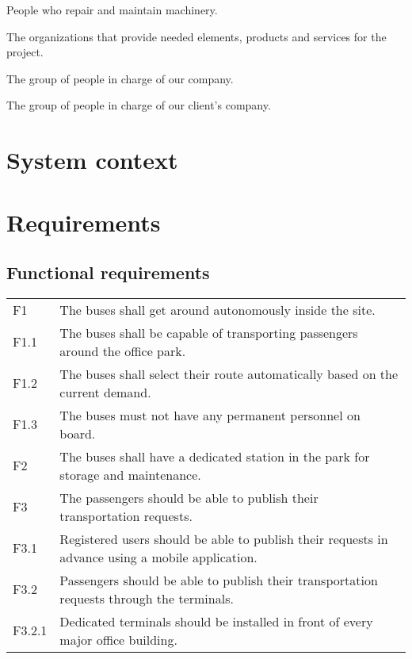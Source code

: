 \documentclass[a4paper]{article}
\begin{document}
\begin{description}[align=right,leftmargin=6cm,style=multiline]
	\item[mechanics]
		People who repair and maintain machinery.

	\item[suppliers]
		The organizations that provide needed elements, products and
		services for the project.

	\item[our company’s management]
		The group of people in charge of our company.

	\item[client's management]
		The group of people in charge of our client's company.
\end{description}



\section{System context}



\section{Requirements}

\subsection{Functional requirements}
\begin{tabularx}{\textwidth}{p{.75cm} X}
	F1     & The buses shall get around autonomously inside the site. \\
	F1.1   & The buses shall be capable of transporting passengers around
	         the office park. \\
	F1.2   & The buses shall select their route automatically based on the
	         current demand. \\
        F1.3   & The buses must not have any permanent personnel on board. \\
	F2     & The buses shall have a dedicated station in the park for
	         storage and maintenance. \\
	F3     & The passengers should be able to publish their transportation
	         requests. \\
	F3.1   & Registered users should be able to publish their requests in
	         advance using a mobile application. \\
	F3.2   & Passengers should be able to publish their transportation
	         requests through the terminals. \\
	F3.2.1 & Dedicated terminals should be installed in front of every major
	         office building. \\
\end{tabularx}
\end{document}
